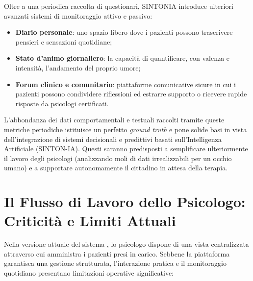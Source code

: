 Oltre a una periodica raccolta di questionari, SINTONIA introduce ulteriori avanzati sistemi di monitoraggio attivo e passivo:
\begin{itemize}
    \item \textbf{Diario personale}: uno spazio libero dove i pazienti possono trascrivere pensieri e sensazioni quotidiane;
    \item \textbf{Stato d'animo giornaliero}: la capacità di quantificare, con valenza e intensità, l'andamento del proprio umore;
    \item \textbf{Forum clinico e comunitario}: piattaforme comunicative sicure in cui i pazienti possono condividere riflessioni ed estrarre supporto o ricevere rapide risposte da psicologi certificati.
\end{itemize}

L'abbondanza dei dati comportamentali e testuali raccolti tramite queste metriche periodiche istituisce un perfetto \textit{ground truth} e pone solide basi in vista dell'integrazione di sistemi decisionali e predittivi basati sull'Intelligenza Artificiale (SINTON-IA). Questi saranno predisposti a semplificare ulteriormente il lavoro degli psicologi (analizzando moli di dati irrealizzabili per un occhio umano) e a supportare autonomamente il cittadino in attesa della terapia.

\clearpage
\section{Il Flusso di Lavoro dello Psicologo: \\ Criticità e Limiti Attuali}
\label{sec:flusso_psicologo}

Nella versione attuale del sistema \cite{sintonia_repo}, lo psicologo dispone di una vista centralizzata attraverso cui amministra i pazienti presi in carico. Sebbene la piattaforma garantisca una gestione strutturata, l'interazione pratica e il monitoraggio quotidiano presentano limitazioni operative significative:

